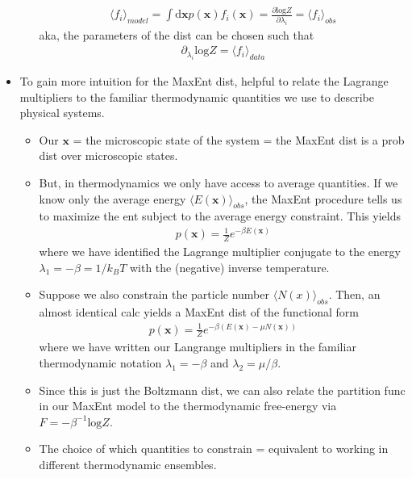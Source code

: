 \documentclass[norsk,a4paper,11pt]{article}
\begin{document}
\begin{itemize}
\begin{itemize}
		\begin{align}
			\langle f_i \rangle_{model} = \int \text{d} \bm{x} p(\bm{x}) f_i(\bm{x}) = \frac{\partial \text{log} Z}{\partial \lambda_i} = \langle f_i \rangle_{obs}
			\label{MaxEnt}
		\end{align}
		aka, the parameters of the dist can be chosen such that
		\begin{align}
			\partial_{\lambda_i} \text{log} Z = \langle f_i \rangle_{data}
		\end{align}
	\end{itemize}
	\item To gain more intuition for the MaxEnt dist, helpful to relate the Lagrange multipliers to the familiar thermodynamic quantities we use to describe physical systems.
	\begin{itemize}
		\item Our $\bm{x}$ = the microscopic state of the system = the MaxEnt dist is a prob dist over microscopic states.
		\item But, in thermodynamics we only have access to average quantities. If we know only the average energy $\langle E(\bm{x}) \rangle_{obs}$, the MaxEnt procedure tells us to maximize  the ent subject to the average energy constraint. This yields
		\begin{align}
			p(\bm{x}) = \frac{1}{Z} e^{-\beta E(\bm{x})}
		\end{align}
		where we have identified the Lagrange multiplier conjugate to the energy $\lambda_1 = -\beta = 1/k_B T$ with the (negative) inverse temperature. 
		\item Suppose we also constrain the particle number $\langle N(x) \rangle_{obs}$. Then, an almost identical calc yields a MaxEnt dist of the functional form 
		\begin{align}
			p(\bm{x}) = \frac{1}{Z} e^{-\beta (E(\bm{x}) - \mu N(\bm{x}))}
		\end{align}
		where we have written our Langrange multipliers in the familiar thermodynamic notation $\lambda_1 = -\beta$ and $\lambda_2 = \mu / \beta$.
		\item Since this is just the Boltzmann dist, we can also relate the partition func in our MaxEnt model to the thermodynamic free-energy via $F=-\beta^{-1} \text{log} Z$.
		\item The choice of which quantities to constrain = equivalent to working in different thermodynamic ensembles.
	\end{itemize}
\end{itemize}
\end{document}
